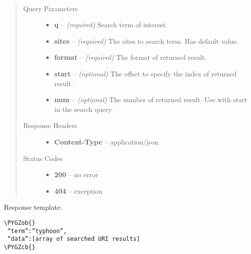 \documentclass[letterpaper,10pt,english]{sphinxmanual}
\def\PYGZob{\char`\{}
\def\PYGZcb{\char`\}}
\begin{document}
\begin{fulllineitems}
\label{docs/uss:get--uss_?q, sites, output, start, num_}~\begin{quote}\begin{description}
\item[{Query Parameters}] \leavevmode\begin{itemize}
\item {} 
\textbf{q} -- \emph{(required)} Search term of interest.

\item {} 
\textbf{sites} -- \emph{(required)} The sites to search term. Has default value.

\item {} 
\textbf{format} -- \emph{(required)} The format of returned result.

\item {} 
\textbf{start} -- \emph{(optional)} The offset to specify the index of returned result.

\item {} 
\textbf{num} -- \emph{(optional)} The number of returned result. Use with start in the search query.

\end{itemize}

\item[{Response Headers}] \leavevmode\begin{itemize}
\item {} 
\textbf{Content-Type} -- application/json

\end{itemize}

\item[{Status Codes}] \leavevmode\begin{itemize}
\item {} 
\textbf{200} -- no error

\item {} 
\textbf{404} -- exception

\end{itemize}

\end{description}\end{quote}

\end{fulllineitems}


Response template:

\begin{Verbatim}[commandchars=\\\{\}]
\PYGZob{}
 “term”:”typhoon”,
 “data”:[array of searched URI results]
\PYGZcb{}
\end{Verbatim}
\end{document}

